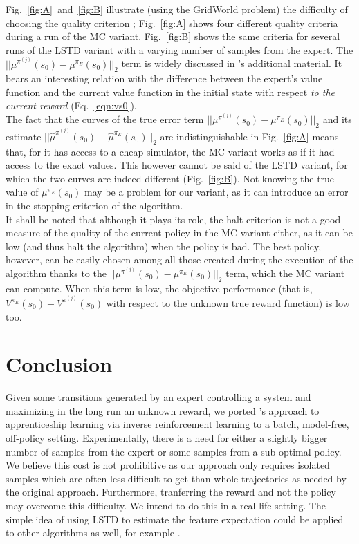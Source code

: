 \documentclass{llncs}
\begin{document}
Fig.~\ref{fig:A}~and~\ref{fig:B} illustrate (using the GridWorld problem) the difficulty of choosing the quality criterion ; Fig.~\ref{fig:A} shows four different quality criteria during a run of the MC variant. Fig.~\ref{fig:B} shows the same criteria for several runs of the LSTD variant with a varying number of samples from the expert. The $||\mu^{\pi^{(j)}}(s_0) - \mu^{\pi_E}(s_0)||_2$ term is widely discussed in \citep{abbeel2004apprenticeship}'s additional material. It bears an interesting relation with the difference between the expert's value function and the current value function in the initial state with respect \emph{to the current reward} (Eq.~\ref{eqn:vs0}).\\

The fact that  the curves of the true error term $||\mu^{\pi^{(j)}}(s_0) - \mu^{\pi_E}(s_0)||_2$ and  its estimate $||\hat\mu^{\pi^{(j)}}(s_0) - \hat\mu^{\pi_E}(s_0)||_2$ are indistinguishable in Fig.~\ref{fig:A} means that, for it has access to a cheap simulator, the MC variant works as if it had access to the exact values. This however cannot be said of the LSTD variant, for which the two curves are indeed different (Fig.~\ref{fig:B}). Not knowing the true value of $\mu^{\pi_E}(s_0)$ may be a problem for our variant, as it can introduce an error in the stopping criterion of the algorithm.\\

It shall be noted that although it plays its role, the halt criterion is not a good measure of the quality of the current policy in the MC variant either, as it can be low (and thus halt the algorithm) when the policy is bad. The best policy, however, can be easily chosen among all those created during the execution of the algorithm thanks to the $||\mu^{\pi^{(j)}}(s_0) - \mu^{\pi_E}(s_0)||_2$ term, which the MC variant can compute. When this term is low, the objective performance (that is, $V^{\pi_E}(s_0)-V^{\pi^{(j)}}(s_0)$ with respect to the unknown true reward function) is low too. 
\section{Conclusion}
\label{sec:conclusion}
Given some transitions generated by an expert controlling a system and maximizing in the long run an unknown reward, we ported \citet{abbeel2004apprenticeship}'s approach to apprenticeship learning via inverse reinforcement learning to a batch, model-free, off-policy setting. Experimentally, there is a need for either a slightly bigger number of samples from the expert or some samples from a sub-optimal policy. We believe this cost is not prohibitive as our approach only requires isolated samples which are often less difficult to get than whole trajectories as needed by the original approach. Furthermore, tranferring the reward and not the policy may overcome this difficulty. We intend to do this in a real life setting.
The simple idea of using LSTD to estimate the feature expectation could be applied to other algorithms as well, for example \citep{abbeel2004apprenticeship,syed2008apprenticeship,syed2008game,ziebart2008maximum}.\\

%


\end{document}
